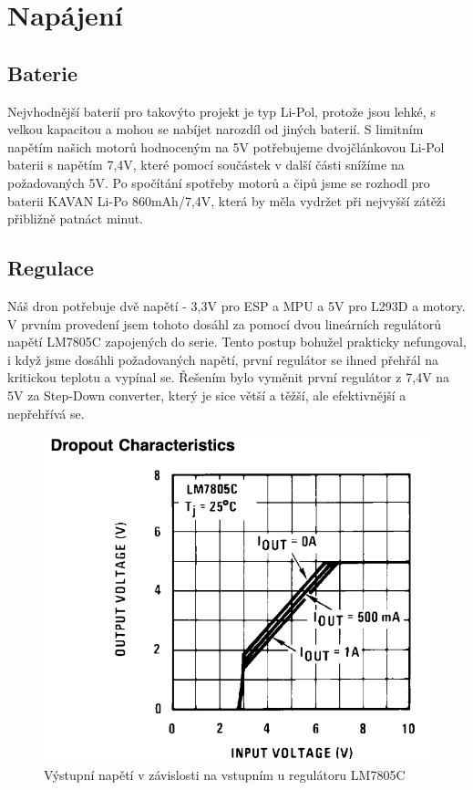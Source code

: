 \section{Napájení}

\subsection*{Baterie}
    Nejvhodnější baterií pro takovýto projekt je typ Li-Pol, protože jsou lehké, s velkou kapacitou a mohou se nabíjet narozdíl od jiných baterií. S limitním napětím našich motorů hodnoceným na 5V potřebujeme dvojčlánkovou Li-Pol baterii s napětím 7,4V, které pomocí součástek v další části snížíme na požadovaných 5V. Po spočítání spotřeby motorů a čipů jsme se rozhodl pro baterii KAVAN Li-Po 860mAh/7,4V, která by měla vydržet při nejvyšší zátěži přibližně patnáct minut.
    
\subsection*{Regulace}
    Náš dron potřebuje dvě napětí - 3,3V pro ESP a MPU a 5V pro L293D a motory. V prvním provedení jsem tohoto dosáhl za pomocí dvou lineárních regulátorů napětí LM7805C zapojených do serie. Tento postup bohužel prakticky nefungoval, i když jsme dosáhli požadovaných napětí, první regulátor se ihned přehřál na kritickou teplotu a vypínal se. Řešením bylo vyměnit první regulátor z 7,4V na 5V za Step-Down converter, který je sice větší a těžší, ale efektivnější a nepřehřívá se.
    
    \begin{figure}[h]
        \centering
        \includegraphics[scale=0.7]{images/regulartor.png}
        \caption{Výstupní napětí v závislosti na vstupním u regulátoru LM7805C\cite{LM7805C}}
    \end{figure}


